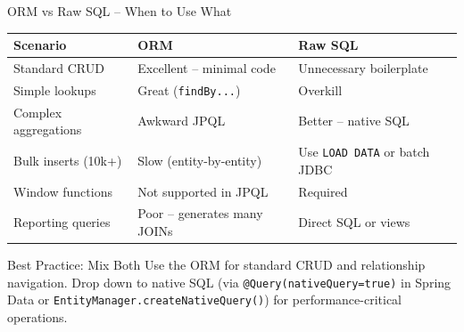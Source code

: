 \begin{frame}{ORM vs Raw SQL -- When to Use What}
  \begin{center}
  \renewcommand{\arraystretch}{1.3}
  \begin{tabularx}{\linewidth}{@{}lXX@{}}
    \toprule
    \textbf{Scenario} & \textbf{ORM} & \textbf{Raw SQL} \\
    \midrule
    Standard CRUD       & Excellent -- minimal code & Unnecessary boilerplate \\
    Simple lookups      & Great (\texttt{findBy...}) & Overkill \\
    Complex aggregations & Awkward JPQL & Better -- native SQL \\
    Bulk inserts (10k+) & Slow (entity-by-entity) & Use \texttt{LOAD DATA} or batch JDBC \\
    Window functions    & Not supported in JPQL & Required \\
    Reporting queries   & Poor -- generates many JOINs & Direct SQL or views \\
    \bottomrule
  \end{tabularx}
  \end{center}

  \begin{block}{Best Practice: Mix Both}
    Use the ORM for standard CRUD and relationship navigation.
    Drop down to native SQL (via \texttt{@Query(nativeQuery=true)} in Spring Data or
    \texttt{EntityManager.createNativeQuery()}) for performance-critical operations.
  \end{block}
\end{frame}
